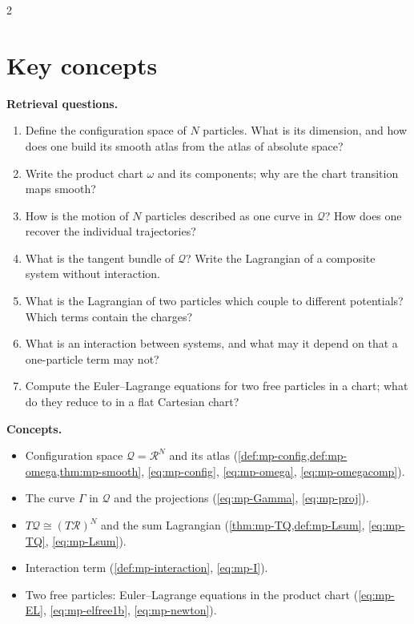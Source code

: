 \begin{paracol}{2}
\section*{Key concepts}
\begin{keyconcepts}
\textbf{Retrieval questions.}
\begin{enumerate}
  \item Define the configuration space of $N$ particles. What is its dimension, and how does one build its smooth atlas from the atlas of absolute space?
  \item Write the product chart $\omega$ and its components; why are the chart transition maps smooth?
  \item How is the motion of $N$ particles described as one curve in $\mathcal Q$? How does one recover the individual trajectories?
  \item What is the tangent bundle of $\mathcal Q$? Write the Lagrangian of a composite system without interaction.
  \item What is the Lagrangian of two particles which couple to different potentials? Which terms contain the charges?
  \item What is an interaction between systems, and what may it depend on that a one-particle term may not?
  \item Compute the Euler--Lagrange equations for two free particles in a chart; what do they reduce to in a flat Cartesian chart?
\end{enumerate}
\textbf{Concepts.}
\begin{itemize}
  \item Configuration space $\mathcal Q=\mathcal R^N$ and its atlas (\cref{def:mp-config,def:mp-omega,thm:mp-smooth}, \eqref{eq:mp-config}, \eqref{eq:mp-omega}, \eqref{eq:mp-omegacomp}).
  \item The curve $\Gamma$ in $\mathcal Q$ and the projections (\eqref{eq:mp-Gamma}, \eqref{eq:mp-proj}).
  \item $T\mathcal Q\cong(T\mathcal R)^N$ and the sum Lagrangian (\cref{thm:mp-TQ,def:mp-Lsum}, \eqref{eq:mp-TQ}, \eqref{eq:mp-Lsum}).
  \item Interaction term (\cref{def:mp-interaction}, \eqref{eq:mp-I}).
  \item Two free particles: Euler--Lagrange equations in the product chart (\eqref{eq:mp-EL}, \eqref{eq:mp-elfree1b}, \eqref{eq:mp-newton}).
\end{itemize}
\end{keyconcepts}

\flushside
\end{paracol}
